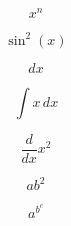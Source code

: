 \documentclass{article}
\begin{document}
\[
x^n
\]

\[
\sin^2 (x)
\]

\[
dx
\]

\[
\int x\,dx
\]

\[
\frac{d}{dx}x^2
\]

\[
ab^2
\]

\[
a^{b^c}
\]
\end{document}
